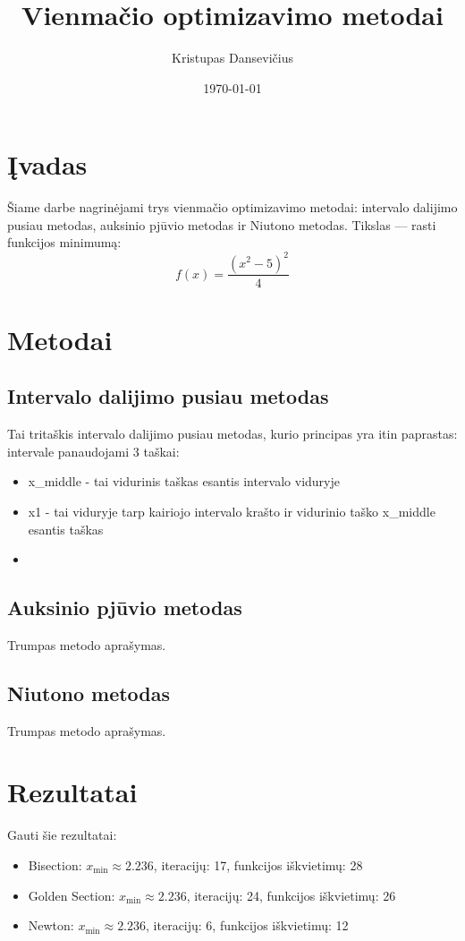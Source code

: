 \documentclass[a4paper,12pt]{article}
\title{Vienmačio optimizavimo metodai}
\author{Kristupas Dansevičius}
\date{\today}
\begin{document}
\maketitle

\section{Įvadas}
Šiame darbe nagrinėjami trys vienmačio optimizavimo metodai:
intervalo dalijimo pusiau metodas, auksinio pjūvio metodas ir Niutono metodas. 
Tikslas --- rasti funkcijos minimumą:
\[
f(x) = \frac{(x^2 - 5)^2}{4}
\]

\section{Metodai}
\subsection{Intervalo dalijimo pusiau metodas}
Tai tritaškis intervalo dalijimo pusiau metodas, kurio principas yra itin paprastas:
intervale panaudojami 3 taškai:
\begin{itemize}
    \item x_middle - tai vidurinis taškas esantis intervalo viduryje
    \item x1 - tai viduryje tarp kairiojo intervalo krašto ir vidurinio taško x_middle esantis taškas
    \item 
\end{itemize}

\subsection{Auksinio pjūvio metodas}
Trumpas metodo aprašymas.

\subsection{Niutono metodas}
Trumpas metodo aprašymas.

\section{Rezultatai}
Gauti šie rezultatai:

\begin{itemize}
    \item Bisection: $x_{\min} \approx 2.236$, iteracijų: 17, funkcijos iškvietimų: 28
    \item Golden Section: $x_{\min} \approx 2.236$, iteracijų: 24, funkcijos iškvietimų: 26
    \item Newton: $x_{\min} \approx 2.236$, iteracijų: 6, funkcijos iškvietimų: 12
\end{itemize}
\end{document}
